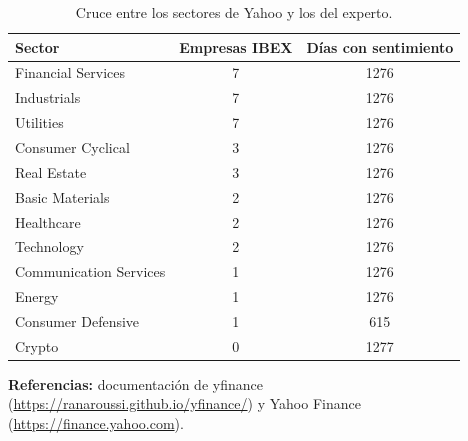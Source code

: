 \documentclass[11pt,a4paper]{article}
\begin{document}
\begin{table}[h]
\centering
\begin{tabular}{lcc}
\toprule
Sector & Empresas IBEX & Días con sentimiento \\
\midrule
Financial Services & 7 & 1276 \\
Industrials & 7 & 1276 \\
Utilities & 7 & 1276 \\
Consumer Cyclical & 3 & 1276 \\
Real Estate & 3 & 1276 \\
Basic Materials & 2 & 1276 \\
Healthcare & 2 & 1276 \\
Technology & 2 & 1276 \\
Communication Services & 1 & 1276 \\
Energy & 1 & 1276 \\
Consumer Defensive & 1 & 615 \\
Crypto & 0 & 1277 \\
\bottomrule
\end{tabular}
\caption{Cruce entre los sectores de Yahoo y los del experto.}
\end{table}

\textbf{Referencias:} documentación de yfinance (\url{https://ranaroussi.github.io/yfinance/}) y Yahoo Finance (\url{https://finance.yahoo.com}).
\end{document}
